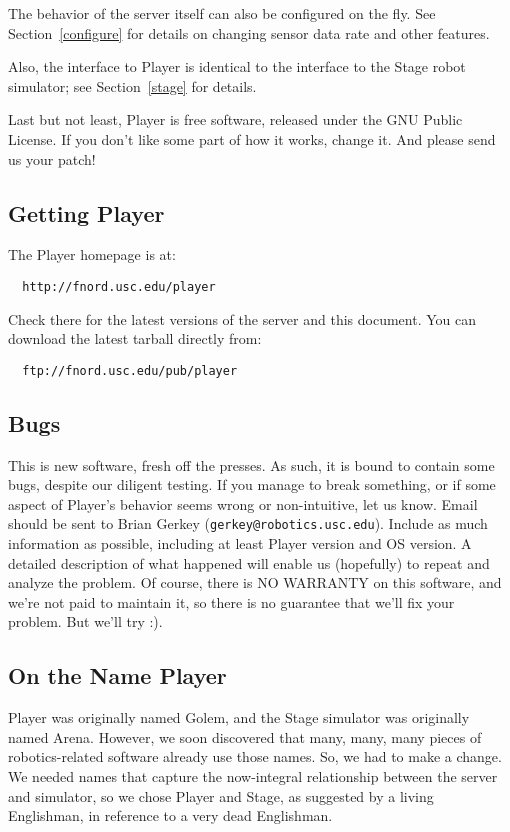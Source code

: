 \documentclass[11pt]{article}
\begin{document}
The behavior of the server itself can also be configured on the fly.  See 
Section~\ref{configure} for details on changing sensor data rate
and other features.

Also, the interface to Player is identical to the interface to the Stage
robot simulator; see Section~\ref{stage} for details.

Last but not least, Player is free software, released under the GNU Public
License.  If you don't like some part of how it works, change it.
And please send us your patch!


\newpage
\subsection{Getting Player}
\label{gettingplayer}
The Player homepage is at:
\vspace{-0.5em}
\begin{verbatim}
  http://fnord.usc.edu/player
\end{verbatim}
\vspace{-0.5em}
Check there for the latest versions of the server and this
document.
You can download the latest tarball directly from:
\vspace{-0.5em}
\begin{verbatim}
  ftp://fnord.usc.edu/pub/player
\end{verbatim}


\subsection{Bugs}
This is new software, fresh off the presses.  As such, it is bound to contain
some bugs, despite our diligent testing.   If you manage to break something,
or if some aspect of Player's behavior seems wrong or non-intuitive,
let us know.  Email should be sent to Brian Gerkey ({\tt gerkey@robotics.usc.edu}).
Include as much information as possible, including at least
Player version and OS version.  A detailed description of what happened
will enable us (hopefully) to repeat and analyze the problem.  Of course,
there is NO WARRANTY on this software, and we're not paid to maintain it,
so there is no guarantee that we'll fix your problem.  But we'll try :).


\subsection{On the Name Player}
Player was originally named Golem, and the Stage simulator was originally
named Arena.  However, we soon discovered that many,
many, many pieces of robotics-related software already use those names.
So, we had to make a change.  We needed names that capture the now-integral
relationship between the server and simulator, so we chose Player and
Stage, as suggested by a living Englishman, in reference to a
very dead Englishman.
\end{document}
